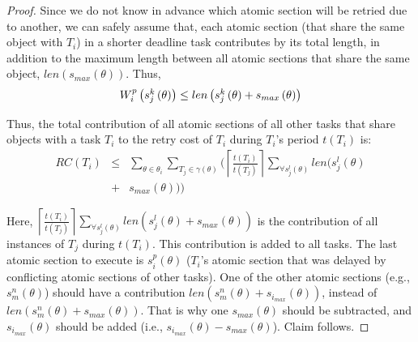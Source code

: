 \documentclass[a4paper,english]{article}
\newtheorem{proof}{Proof}
\begin{document}
\begin{proof}
Since we do not know in advance which atomic section will be retried
due to another, we can safely assume that, each atomic section (that share the same object with  $T_i$) in a shorter deadline task contributes by its total length, in addition to the maximum length between all atomic sections that share the same object, $len(s_{max}(\theta))$. Thus, 
\begin{equation}
\mbox{\ensuremath{W_{i}^{p}\left(s_{j}^{k}\left(\theta\right)\right)\le len\left(s_{j}^{k}\left(\theta\right)+s_{max}\left(\theta\right)\right)}}\label{eq2}\end{equation}


Thus, the total contribution of all atomic sections of all other tasks
that share objects with a task $T_i$ 
to the retry cost of $T_i$ during $T_i$'s period $t(T_{i})$ is:
\begin{eqnarray}
RC\left(T_{i}\right) & \le & \sum_{\theta\in\theta_{i}}\sum_{T_{j}\in\gamma(\theta)}\Big(\left\lceil\frac{t\left(T_{i}\right)}{t\left(T_{j}\right)}\right\rceil\sum_{\forall s_{j}^{l}(\theta)}len\big(s_{j}^{l}(\theta)\nonumber \\
 & + & s_{max}(\theta)\big)\Big)\label{eq3-1}\end{eqnarray}



Here, $\left\lceil\frac{t\left(T_{i}\right)}{t\left(T_{j}\right)}\right\rceil\sum_{\forall s_{j}^{l}\left(\theta\right)}len\left(s_{j}^{l}\left(\theta\right)+s_{max}\left(\theta\right)\right)$ is  the contribution of all instances of $T_{j}$ during $t(T_{i})$. This contribution is added to all tasks. The last atomic section to execute is $s_{i}^{p}(\theta)$ ($T_i$'s atomic section that was delayed by conflicting atomic sections of other tasks). One of the other atomic sections (e.g., $s_{m}^{n}(\theta)$) should have a contribution $len(s_{m}^{n}(\theta)+s_{i_{max}}(\theta))$, instead of $len(s_{m}^{n}(\theta)+s_{max}(\theta))$. That is why one $s_{max}(\theta)$ should be subtracted, and $s_{i_{max}}(\theta)$ should be added (i.e., $s_{i_{max}}(\theta)-s_{max}(\theta)$). Claim follows.
\end{proof}
\end{document}
